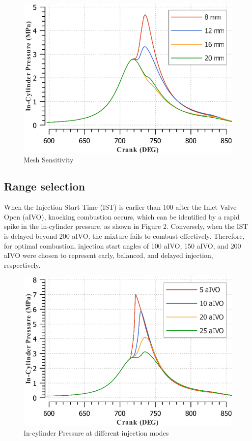 \documentclass[conference]{IEEEtran}
\begin{document}
\begin{figure}[htbp]
    \centerline{\includegraphics{plots and graphs/1.png}}
    \caption{Mesh Sensitivity}
    \label{plt_1}
    \end{figure}


\subsection{Range selection}
When the Injection Start Time (IST) is earlier than 100 after the Inlet Valve Open (aIVO), knocking combustion occurs, which can be identified by a rapid spike in the in-cylinder pressure, as shown in Figure 2. Conversely, when the IST is delayed beyond 200 aIVO, the mixture fails to combust effectively. Therefore, for optimal combustion, injection start angles of 100 aIVO, 150 aIVO, and 200 aIVO were chosen to represent early, balanced, and delayed injection, respectively.
\begin{figure}[htbp]
    \centerline{\includegraphics{plots and graphs/2.png}}
    \caption{In-cylinder Pressure at different injection modes}
    \label{plt_2}
    \end{figure}
\end{document}
